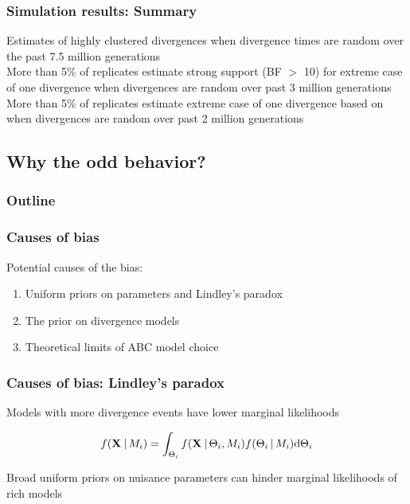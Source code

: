 \begin{frame}
    \frametitle{Simulation results: Summary}
    Estimates of highly clustered divergences when divergence times are random
    over the past 7.5 million generations \\
    \bigskip
    More than 5\% of replicates estimate strong support (BF $>$ 10) for
    extreme case of one divergence when divergences are random over past 3
    million generations \\
    \bigskip
    More than 5\% of replicates estimate extreme case of one divergence based
    on \vmratio{} when divergences are random over past 2 million generations
\end{frame}

\subsection{Why the odd behavior?}

\begin{frame}
\frametitle{Outline}
\end{frame}

\begin{frame}
    \frametitle{Causes of bias}
    Potential causes of the bias:
    \begin{enumerate}
        \item Uniform priors on parameters and Lindley's paradox
        \item The prior on divergence models
        \item Theoretical limits of ABC model choice
    \end{enumerate}
\end{frame}

\begin{frame}
    \frametitle{Causes of bias: Lindley's paradox}
    Models with more divergence events have lower marginal likelihoods \\
    \bigskip
    \begin{displaybox}[7.5cm]
        \[
            f(\alignmentVector \given M_i) = \int_{\Theta_i} f(\alignmentVector
            \given \Theta_i, M_i) f(\Theta_i \given M_i) \mathrm{d}\Theta_i
        \]\vspace{0mm}
    \end{displaybox}
    \bigskip
    Broad uniform priors on nuisance parameters can hinder marginal likelihoods
    of rich models \\
\end{frame}

